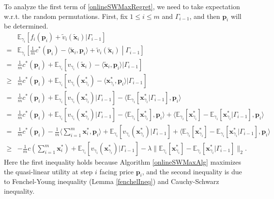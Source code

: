 \documentclass{article}
\begin{document}
To analyze the first term of \eqref{onlineSWMaxRegret}, we need to take expectation w.r.t. the random permutations. First, fix $1\le i\le m$ and $\Gamma_{i-1}$, and then $\mathbf{p}_i$ will be determined.
\begin{equation}\label{onlineSWMaxRegretTerm1}
    \begin{array}{rl}
         & \mathbb{E}_{\gamma_i}[f_i(\mathbf{p}_i)+\tilde{v}_i(\tilde{\mathbf{x}}_i)|\Gamma_{i-1}] \\
        = & \mathbb{E}_{\gamma_i}\left[\frac{1}{m}c^*(\mathbf{p}_i)-\langle \tilde{\mathbf{x}}_i,\mathbf{p}_i\rangle+\tilde{v}_i(\tilde{\mathbf{x}}_i)\middle|\Gamma_{i-1}\right] \\
        = & \frac{1}{m}c^*(\mathbf{p}_i)+\mathbb{E}_{\gamma_i}[v_{\gamma_i}(\tilde{\mathbf{x}}_i)-\langle \tilde{\mathbf{x}}_i,\mathbf{p}_i\rangle|\Gamma_{i-1}] \\
        \ge & \frac{1}{m}c^*(\mathbf{p}_i)+\mathbb{E}_{\gamma_i}[v_{\gamma_i}(\mathbf{x}_{\gamma_i}^*)-\langle \mathbf{x}_{\gamma_i}^*,\mathbf{p}_i\rangle|\Gamma_{i-1}] \\
        = & \frac{1}{m}c^*(\mathbf{p}_i)+\mathbb{E}_{\gamma_i}[v_{\gamma_i}(\mathbf{x}_{\gamma_i}^*)|\Gamma_{i-1}]-\langle \mathbb{E}_{\gamma_i}[\mathbf{x}_{\gamma_i}^*|\Gamma_{i-1}],\mathbf{p}_i\rangle \\
        = & \frac{1}{m}c^*(\mathbf{p}_i)+\mathbb{E}_{\gamma_i}[v_{\gamma_i}(\mathbf{x}_{\gamma_i}^*)|\Gamma_{i-1}]-\langle \mathbb{E}_{\gamma_i}[\mathbf{x}_{\gamma_i}^*],\mathbf{p}_i\rangle+\langle \mathbb{E}_{\gamma_i}[\mathbf{x}_{\gamma_i}^*]-\mathbb{E}_{\gamma_i}[\mathbf{x}_{\gamma_i}^*|\Gamma_{i-1}],\mathbf{p}_i\rangle \\
        = & \frac{1}{m}c^*(\mathbf{p}_i)-\frac{1}{m}\langle \sum_{i=1}^{m}\mathbf{x}_i^*,\mathbf{p}_i\rangle+\mathbb{E}_{\gamma_i}[v_{\gamma_i}(\mathbf{x}_{\gamma_i}^*)|\Gamma_{i-1}]+\langle \mathbb{E}_{\gamma_i}[\mathbf{x}_{\gamma_i}^*]-\mathbb{E}_{\gamma_i}[\mathbf{x}_{\gamma_i}^*|\Gamma_{i-1}],\mathbf{p}_i\rangle \\
        \ge &  -\frac{1}{m}c(\sum_{i=1}^{m}\mathbf{x}_i^*)+\mathbb{E}_{\gamma_i}[v_{\gamma_i}(\mathbf{x}_{\gamma_i}^*)|\Gamma_{i-1}]-\lambda\|\mathbb{E}_{\gamma_i}[\mathbf{x}_{\gamma_i}^*]-\mathbb{E}_{\gamma_i}[\mathbf{x}_{\gamma_i}^*|\Gamma_{i-1}]\|_2.
    \end{array}
\end{equation}
Here the first inequality holds because Algorithm \ref{onlineSWMaxAlg} maximizes the quasi-linear utility at step $i$ facing price $\mathbf{p}_i$, and the second inequality is due to Fenchel-Young inequality (Lemma \ref{fenchelIneq}) and Cauchy-Schwarz inequality.
\end{document}
